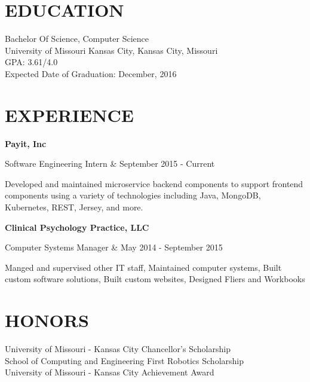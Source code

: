 \documentclass[margin,11pt]{res} %
\begin{document}

\address{ 5601 Lydia Avenue \\ Kansas City, Missouri 64112 \\
(913) 908-6148 \\ cdrm4@mail.umkc.edu \\}

\begin{resume}
 
\section{EDUCATION}       
 Bachelor Of Science, Computer Science  \\
                University of Missouri Kansas City, Kansas City, Missouri \\ 
                GPA: 3.61/4.0 \\
                Expected Date of Graduation: December, 2016
 
 
\section{EXPERIENCE}      

		{\bf Payit, Inc} \\
			\begin{ncolumn}{2}
			Software Engineering Intern & September 2015 - Current
			\end{ncolumn}
			Developed and maintained microservice backend components to support frontend components using a variety of technologies including Java, MongoDB, Kubernetes, REST, Jersey, and more.
			
		{\bf Clinical Psychology Practice, LLC} \\
			\begin{ncolumn}{2}
			Computer Systems Manager & May 2014 - September 2015
			\end{ncolumn}
			Manged and supervised other IT staff, Maintained computer systems, Built custom software solutions, Built custom websites, Designed Fliers and Workbooks
		
 
 
\section{HONORS}
University of Missouri - Kansas City Chancellor's Scholarship \\
School of Computing and Engineering First Robotics Scholarship \\ 
University of Missouri - Kansas City Achievement Award  \\


\end{resume}
\end{document}
